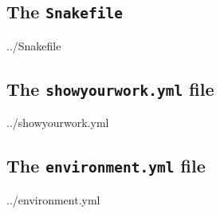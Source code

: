 \documentclass[twocolumn]{aastex631}
\begin{document}
\subsection{The \texttt{Snakefile}}
\label{sec:Snakefile}
%

{../Snakefile}

\subsection{The \texttt{showyourwork.yml} file}
\label{sec:showyourworkyml}
%

{../showyourwork.yml}

\subsection{The \texttt{environment.yml} file}
\label{sec:environmentyml}
%

{../environment.yml}


\end{document}
